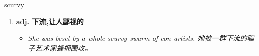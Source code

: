 
\begin{frame}
{\huge scurvy}
\begin{center}
\begin{enumerate}\Large
  \item \textbf{adj. 下流,让人鄙视的}
  \begin{itemize}
    \item \em{\Large{She was beset by a whole scurvy swarm of con artists. 她被一群下流的骗子艺术家蜂拥围攻。}}
  \end{itemize}
\end{enumerate}
\end{center}
\end{frame}
